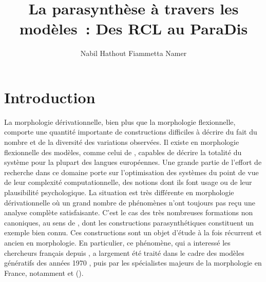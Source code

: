 \documentclass[output=paper]{langsci/langscibook}
\title{\texorpdfstring{La parasynthèse à travers les modèles~: Des RCL au {ParaDis}}{La parasynthèse à travers les modèles~: Des RCL au {ParaDis}}}
\author{Nabil Hathout\affiliation{CLLE. Université de Toulouse \& CNRS}  \lastand Fiammetta Namer\affiliation{Université de Lorraine \& ATILF CNRS}}
\begin{document}

\section{Introduction}
\label{sec:introduction}

La morphologie dérivationnelle, bien plus que la morphologie flexionnelle, comporte une quantité importante  de constructions difficiles à décrire du fait du nombre et de la diversité des variations observées.  Il existe en morphologie flexionnelle des modèles, comme celui de \citep{Stump16}, capables de décrire la totalité du système pour la plupart des langues européennes.  Une grande partie de l'effort de recherche dans ce domaine porte sur l'optimisation des systèmes du point de vue de leur complexité computationnelle, des notions dont ils font usage ou de leur plausibilité psychologique.   La situation est très différente en morphologie dérivationnelle où un grand nombre de phénomènes n'ont toujours pas reçu une analyse complète satisfaisante.  C'est le cas des très nombreuses formations non canoniques, au sens de \cite{Corbett10}, dont les constructions parasynthétiques constituent un exemple bien connu.
Ces constructions sont un objet d'étude à la fois récurrent et ancien en morphologie.  En particulier, ce phénomène, qui a  interessé les chercheurs français depuis \cite{Darmesteter1877,darmesteter1894.traite-formation},  a largement été traité dans le cadre des modèles génératifs des années 1970 \citep{Dell70,Dell1979}, puis par les spécialistes majeurs de la morphologie en France, notamment \cite{corbin1980.parasynthese,Corbin87} et \citeauthor{Fradin1997e} (\citeyear*{Fradin1997e,fradin1997.anti,Fradin03}).%
\end{document}
